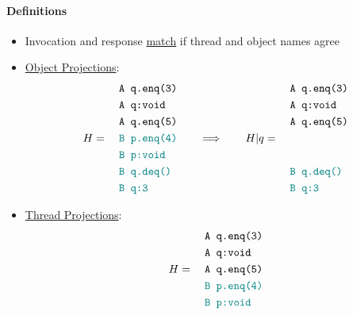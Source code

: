 \documentclass[twocolumn,landscape,10pt]{article}
\theoremstyle{definition}
\begin{document}
\paragraph{Definitions}

\begin{itemize}
    \item Invocation and response \underline{match} if thread and object names
        agree
    \item \underline{Object Projections}:
        \[
            H = \quad\begin{align}
                &\texttt{A q.enq(3)} \\
                &\texttt{A q:void} \\
                &\texttt{A q.enq(5)} \\
                &\textcolor{teal}{\texttt{B p.enq(4)}} \\
                &\textcolor{teal}{\texttt{B p:void}} \\
                &\textcolor{teal}{\texttt{B q.deq()}} \\
                &\textcolor{teal}{\texttt{B q:3}} \\
            \end{align} 
            \qquad\Longrightarrow\qquad
            H|q = \quad\begin{align}
                &\texttt{A q.enq(3)} \\
                &\texttt{A q:void} \\
                &\texttt{A q.enq(5)} \\
                \\
                \\
                &\textcolor{teal}{\texttt{B q.deq()}} \\
                &\textcolor{teal}{\texttt{B q:3}} \\
            \end{align} 
        \]
    \item \underline{Thread Projections}:
        \[
            H = \quad\begin{align}
                &\texttt{A q.enq(3)} \\
                &\texttt{A q:void} \\
                &\texttt{A q.enq(5)} \\
                &\textcolor{teal}{\texttt{B p.enq(4)}} \\
                &\textcolor{teal}{\texttt{B p:void}} \\

\end{align}\]
\end{itemize}
\end{document}
